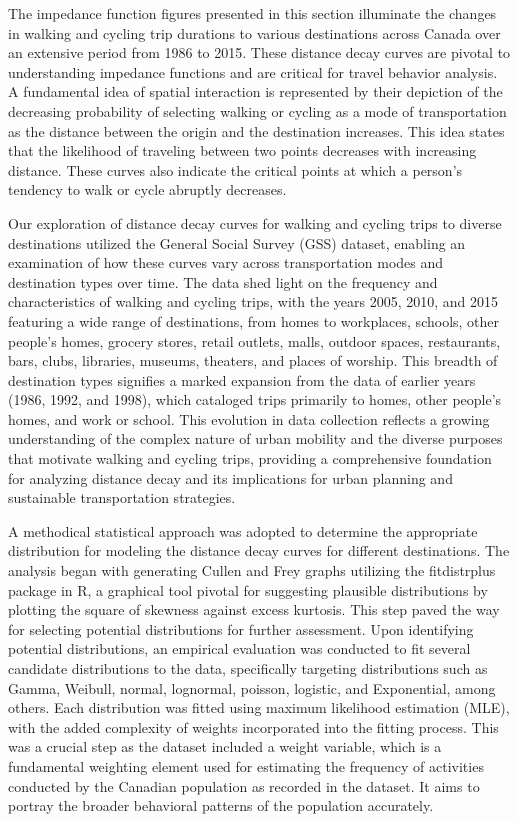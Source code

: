 \documentclass[
11pt, %
oneside, %
english, %
singlespacing, %
]{macthesis} %
\begin{document}
The impedance function figures presented in this section illuminate the changes in walking and cycling trip durations to various destinations across Canada over an extensive period from 1986 to 2015. These distance decay curves are pivotal to understanding impedance functions and are critical for travel behavior analysis. A fundamental idea of spatial interaction is represented by their depiction of the decreasing probability of selecting walking or cycling as a mode of transportation as the distance between the origin and the destination increases. This idea states that the likelihood of traveling between two points decreases with increasing distance. These curves also indicate the critical points at which a person's tendency to walk or cycle abruptly decreases.

Our exploration of distance decay curves for walking and cycling trips to diverse destinations utilized the General Social Survey (GSS) dataset, enabling an examination of how these curves vary across transportation modes and destination types over time. The data shed light on the frequency and characteristics of walking and cycling trips, with the years 2005, 2010, and 2015 featuring a wide range of destinations, from homes to workplaces, schools, other people's homes, grocery stores, retail outlets, malls, outdoor spaces, restaurants, bars, clubs, libraries, museums, theaters, and places of worship. This breadth of destination types signifies a marked expansion from the data of earlier years (1986, 1992, and 1998), which cataloged trips primarily to homes, other people's homes, and work or school. This evolution in data collection reflects a growing understanding of the complex nature of urban mobility and the diverse purposes that motivate walking and cycling trips, providing a comprehensive foundation for analyzing distance decay and its implications for urban planning and sustainable transportation strategies.

A methodical statistical approach was adopted to determine the appropriate distribution for modeling the distance decay curves for different destinations. The analysis began with generating Cullen and Frey graphs utilizing the fitdistrplus package in R, a graphical tool pivotal for suggesting plausible distributions by plotting the square of skewness against excess kurtosis. This step paved the way for selecting potential distributions for further assessment. Upon identifying potential distributions, an empirical evaluation was conducted to fit several candidate distributions to the data, specifically targeting distributions such as Gamma, Weibull, normal, lognormal, poisson, logistic, and Exponential, among others. Each distribution was fitted using maximum likelihood estimation (MLE), with the added complexity of weights incorporated into the fitting process. This was a crucial step as the dataset included a weight variable, which is a fundamental weighting element used for estimating the frequency of activities conducted by the Canadian population as recorded in the dataset. It aims to portray the broader behavioral patterns of the population accurately.
\end{document}
